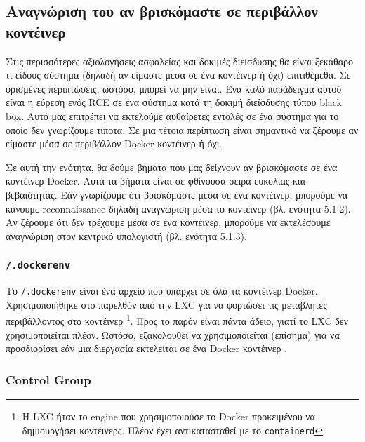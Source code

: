 \subsection{Αναγνώριση του αν βρισκόμαστε σε περιβάλλον κοντέινερ}

Στις περισσότερες αξιολογήσεις ασφαλείας και δοκιμές διείσδυσης θα είναι
ξεκάθαρο τι είδους σύστημα (δηλαδή αν είμαστε μέσα σε ένα κοντέινερ ή όχι)
επιτιθέμεθα. Σε ορισμένες περιπτώσεις, ωστόσο, μπορεί να μην είναι. Ένα καλό
παράδειγμα αυτού είναι η εύρεση ενός \textlatin{RCE} σε ένα σύστημα κατά τη
δοκιμή διείσδυσης τύπου \textlatin{black box}. Αυτό μας επιτρέπει να εκτελούμε
αυθαίρετες εντολές σε ένα σύστημα για το οποίο δεν γνωρίζουμε τίποτα. Σε μια
τέτοια περίπτωση είναι σημαντικό να ξέρουμε αν είμαστε μέσα σε περιβάλλον
\textlatin{Docker} κοντέινερ ή όχι.

Σε αυτή την ενότητα, θα δούμε βήματα που μας δείχνουν αν βρισκόμαστε σε ένα
κοντέινερ \textlatin{Docker}. Αυτά τα βήματα είναι σε φθίνουσα σειρά ευκολίας
και βεβαιότητας. Εάν γνωρίζουμε ότι βρισκόμαστε μέσα σε ένα κοντέινερ, μπορούμε
να κάνουμε \textlatin{reconnaissance} δηλαδή αναγνώριση μέσα το κοντέινερ (βλ.
ενότητα 5.1.2). Αν ξέρουμε ότι δεν τρέχουμε μέσα σε ένα κοντέινερ, μπορούμε να
εκτελέσουμε αναγνώριση στον κεντρικό υπολογιστή (βλ. ενότητα 5.1.3).

\subsubsection{\texttt{\textlatin{/.dockerenv}}}

Το \texttt{\textlatin{/.dockerenv}} είναι ένα αρχείο που υπάρχει σε όλα τα
κοντέινερ \textlatin{Docker}. Χρησιμοποιήθηκε στο παρελθόν από την
\textlatin{LXC} για να φορτώσει τις μεταβλητές περιβάλλοντος στο κοντέινερ
\footnote{Η \textlatin{LXC} ήταν το \textlatin{engine} που χρησιμοποιούσε το
\textlatin{Docker} προκειμένου να δημιουργήσει κοντέινερς. Πλέον έχει
αντικατασταθεί με το \texttt{\textlatin{containerd}}}.
Προς το παρόν είναι πάντα άδειο, γιατί το \textlatin{LXC} δεν χρησιμοποιείται
πλέον. Ωστόσο, εξακολουθεί να χρησιμοποιείται (επίσημα) για να προσδιορίσει εάν
μια διεργασία εκτελείται σε ένα \textlatin{Docker} κοντέινερ
\cite{Metasploit-Linux-Gather-Container-Detection}
\cite{Removed-Dockerinit-Reference}.


\subsubsection{\textlatin{Control Group}}

